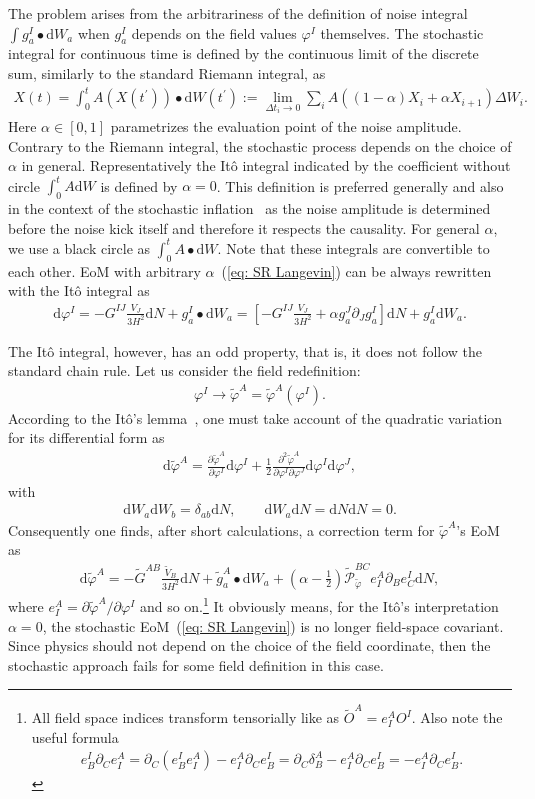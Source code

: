 \documentclass[aps, prd
, preprint
, nofootinbib 
, superscriptaddress
, longbibliography
]{revtex4-1}
\newcommand{\pdif}[2]{\frac{\partial #1}{\partial #2}}
\newcommand{\dd}{\mathrm{d}}
\newcommand{\calP}{\mathcal{P}}
\newcommand{\bae}[1]{\begin{align} #1 \end{align}}
\begin{document}
The problem arises from the arbitrariness of the definition of noise integral $\int g^I_a\bullet\dd W_a$ when $g^I_a$ depends on the field values $\varphi^I$ themselves.
The stochastic integral for continuous time is defined by the continuous limit of the discrete sum, similarly to the standard Riemann integral, as
\bae{
	X(t)=\int^t_0A\left(X(t^\prime)\right)\bullet\dd W(t^\prime):=\lim_{\Delta t_i\to0}\sum_iA\left((1-\alpha)X_i+\alpha X_{i+1}\right)\Delta W_i.
}
Here $\alpha\in[0,1]$ parametrizes the evaluation point of the noise amplitude. Contrary to the Riemann integral, the stochastic process depends on the choice of
$\alpha$ in general. Representatively the It\^o integral indicated by the coefficient without circle $\int^t_0A\dd W$ is defined by $\alpha=0$.
This definition is preferred generally and also in the context of the stochastic inflation~\cite{Salopek:1990re,Vilenkin:1999kd,Tolley:2008na,Fujita:2014tja,
Vennin:2015hra,Tokuda:2017fdh} as the noise amplitude is determined before the noise kick itself and therefore it respects the causality.
For general $\alpha$, we use a black circle as $\int^t_0A\bullet\dd W$. Note that these integrals are convertible to each other. EoM with arbitrary 
$\alpha$~(\ref{eq: SR Langevin}) can be always rewritten with the It\^o integral as
\bae{\label{eq: Langevin in Ito}
	\dd\varphi^I=-G^{IJ}\frac{V_J}{3H^2}\dd N+g^I_a\bullet\dd W_a=\left[-G^{IJ}\frac{V_J}{3H^2}+\alpha g^J_a\partial_Jg^I_a\right]\dd N+g^I_a\dd W_a.
}

The It\^o integral, however, has an odd property, that is, it does not follow the standard chain rule.
Let us consider the field redefinition:
\bae{
	\varphi^I\to\tilde{\varphi}^A=\tilde{\varphi}^A(\varphi^I).
}
According to the It\^o's lemma~\cite{}, one must take account of the quadratic variation for its differential form as
\bae{
	\dd\tilde{\varphi}^A=\pdif{\tilde{\varphi}^A}{\varphi^I}\dd\varphi^I+\frac{1}{2}\frac{\partial^2\tilde{\varphi}^A}{\partial\varphi^I\partial\varphi^J}\dd\varphi^I\dd\varphi^J,
}
with
\bae{
	\dd W_a\dd W_b=\delta_{ab}\dd N, \qquad \dd W_a\dd N=\dd N\dd N=0.
}
Consequently one finds, after short calculations, a correction term for $\tilde{\varphi}^A$'s EoM as
\bae{\label{eq: dphiA}
	\dd\tilde{\varphi}^A=-\tilde{G}^{AB}\frac{\tilde{V}_B}{3H^2}\dd N+\tilde{g}^A_a\bullet\dd W_a
	+\left(\alpha-\frac{1}{2}\right)\tilde{\calP}_{\tilde{\varphi}}^{BC}e^A_I\partial_Be^I_C\dd N,
}
where $e^A_I=\partial\tilde{\varphi}^A/\partial\varphi^I$ and so on.\footnote{All field space indices transform tensorially like as $\tilde{O}^A=e^A_IO^I$.
		Also note the useful formula
\bae{
	e^I_B\partial_Ce^A_I=\partial_C(e^I_Be^A_I)-e^A_I\partial_Ce^I_B=\partial_C\delta^A_B-e^A_I\partial_Ce^I_B=-e^A_I\partial_Ce^I_B.
}}
It obviously means, for the It\^o's interpretation $\alpha=0$, the stochastic EoM~(\ref{eq: SR Langevin}) is no longer field-space covariant.
Since physics should not depend on the choice of the field coordinate, then the stochastic approach fails for some field definition in this case.
\end{document}
